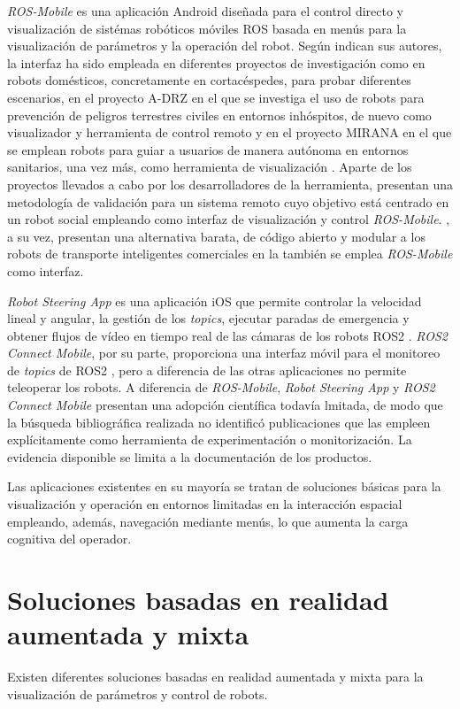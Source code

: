 \textit{ROS-Mobile} es una aplicación Android diseñada para el control directo y 
visualización de sistémas robóticos móviles ROS \parencite{rosROSMobileWiki} basada
en menús para la visualización de parámetros y la operación del robot. Según indican sus autores,
la interfaz ha sido empleada en diferentes proyectos de investigación como en robots domésticos, 
concretamente en cortacéspedes, para probar diferentes escenarios, en el proyecto A-DRZ en el que se investiga
el uso de robots para prevención de peligros terrestres civiles en entornos inhóspitos, de nuevo como visualizador
y herramienta de control remoto y en el proyecto MIRANA en el que se emplean robots para guiar a usuarios de manera 
autónoma en entornos sanitarios, una vez más, como herramienta de visualización
\parencite{RottmannNils2020RAAa}. Aparte de los proyectos llevados a cabo por los desarrolladores de la herramienta, 
\cite{BarbechoJimbo2023RemoteOO} presentan una metodología de validación para un sistema remoto cuyo objetivo está centrado en un robot social empleando
como interfaz de visualización y control \textit{ROS-Mobile}. \cite{Nwankwo2022ROMRAR}, a su vez, presentan una alternativa barata, de código abierto y modular a 
los robots de transporte inteligentes comerciales en la también se emplea \textit{ROS-Mobile} como interfaz. 

\textit{Robot Steering App} es una aplicación iOS que permite controlar 
la velocidad lineal y angular, la gestión de los \textit{topics}, ejecutar paradas 
de emergencia y obtener flujos de vídeo en tiempo real de las cámaras de los robots ROS2
\parencite{appleRobotSteering}.
\textit{ROS2 Connect Mobile}, por su parte, proporciona una interfaz móvil para el monitoreo 
de \textit{topics} de ROS2 \parencite{appleROS2Connect}, pero a diferencia de las otras aplicaciones
no permite teleoperar los robots. A diferencia de \textit{ROS-Mobile}, \textit{Robot Steering App} y \textit{ROS2 Connect Mobile}
presentan una adopción científica todavía lmitada, de modo que la búsqueda bibliográfica realizada no identificó publicaciones
que las empleen explícitamente como herramienta de experimentación o monitorización. La evidencia disponible se limita a la documentación
de los productos.

Las aplicaciones existentes en su mayoría se tratan de soluciones básicas 
para la visualización y operación en entornos limitadas en 
la interacción espacial empleando, además, 
navegación mediante menús, lo que aumenta la carga cognitiva del operador.

\section{Soluciones basadas en realidad aumentada y mixta}
Existen diferentes soluciones basadas en realidad aumentada y mixta para la visualización de 
parámetros y control de robots.

